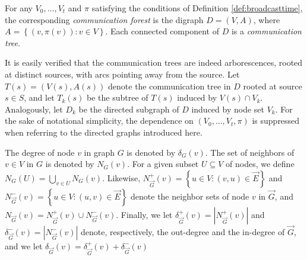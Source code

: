 \begin{definition} \label{def:broadcastgraph}
For any $V_0,\ldots,V_t$ and $\pi$ satisfying the conditions of Definition \ref{def:broadcasttime},
the corresponding \emph{communication forest} is
the digraph $D=(V,A)$, where $A=\left\{\left(v,\pi(v)\right): v\in V\right\}$.
Each connected component of $D$ is a \emph{communication tree}.
\end{definition}

\noindent
It is easily verified that the communication trees are indeed arborescences, rooted at distinct sources, with arcs pointing away from the source.
Let $T(s)=\left(V(s),A(s)\right)$ denote the communication tree in $D$ rooted at source $s\in S$,
and let $T_k(s)$ be the subtree of $T(s)$ induced by $V(s)\cap V_k$.
Analogously, let $D_k$ be the directed subgraph of $D$ induced by node set $V_k$.
For the sake of notational simplicity, the dependence on $(V_0,\ldots,V_t,\pi)$ is suppressed when referring to the directed graphs introduced here.

The degree of node $v$ in graph $G$ is denoted by $\delta_G(v)$.
The set of neighbors of $v\in V$ in $G$ is denoted by $N_G(v)$.
For a given subset $U\subseteq V$ of nodes, we define $N_G(U)=\bigcup_{v\in U}N_G(v)$.
Likewise, $N_{\overrightarrow{G}}^+(v)=\left\{u\in V:(v,u)\in \overrightarrow{E}\right\}$ and $N_{\overrightarrow{G}}^-(v)=\left\{u\in V:(u,v)\in \overrightarrow{E}\right\}$ denote the neighbor sets of node $v$ in $\overrightarrow{G}$,
and $N_{\overrightarrow{G}}(v)=N_{\overrightarrow{G}}^+(v)\cup N_{\overrightarrow{G}}^-(v)$.
Finally, we let $\delta^+_{\overrightarrow{G}}(v)=\left|N_{\overrightarrow{G}}^+(v)\right|$ and $\delta^-_{\overrightarrow{G}}(v)=\left|N_{\overrightarrow{G}}^-(v)\right|$ denote, respectively, the out-degree and the in-degree of $\overrightarrow{G}$,
and we let $\delta_{\overrightarrow{G}}(v)=\delta_{\overrightarrow{G}}^+(v)+\delta_{\overrightarrow{G}}^-(v)$


